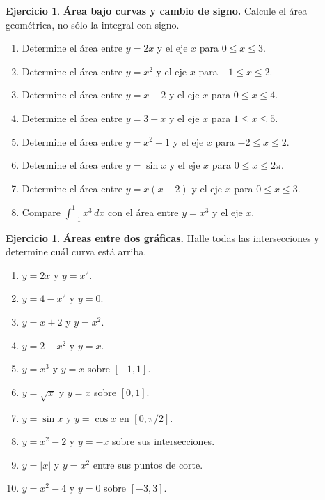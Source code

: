\documentclass[12pt]{article}
\theoremstyle{definition}
\newtheorem{Ejer}[teorema]{Ejercicio}
\theoremstyle{remark}
\newcommand{\dd}{\,dx}
\begin{document}
\begin{Ejer}\textbf{Área bajo curvas y cambio de signo.} Calcule el área geométrica, no sólo la integral con signo.
\begin{enumerate}[series=banco3]
\item Determine el área entre $y=2x$ y el eje $x$ para $0\le x\le3$.
\item Determine el área entre $y=x^2$ y el eje $x$ para $-1\le x\le2$.
\item Determine el área entre $y=x-2$ y el eje $x$ para $0\le x\le4$.
\item Determine el área entre $y=3-x$ y el eje $x$ para $1\le x\le5$.
\item Determine el área entre $y=x^2-1$ y el eje $x$ para $-2\le x\le2$.
\item Determine el área entre $y=\sin x$ y el eje $x$ para $0\le x\le2\pi$.
\item Determine el área entre $y=x(x-2)$ y el eje $x$ para $0\le x\le3$.
\item Compare $\int_{-1}^1x^3\dd$ con el área entre $y=x^3$ y el eje $x$.
\end{enumerate}
\end{Ejer}

\begin{Ejer}\textbf{Áreas entre dos gráficas.} Halle todas las intersecciones y determine cuál curva está arriba.
\begin{enumerate}[resume=banco3]
\item $y=2x$ y $y=x^2$.
\item $y=4-x^2$ y $y=0$.
\item $y=x+2$ y $y=x^2$.
\item $y=2-x^2$ y $y=x$.
\item $y=x^3$ y $y=x$ sobre $[-1,1]$.
\item $y=\sqrt x$ y $y=x$ sobre $[0,1]$.
\item $y=\sin x$ y $y=\cos x$ en $[0,\pi/2]$.
\item $y=x^2-2$ y $y=-x$ sobre sus intersecciones.
\item $y=|x|$ y $y=x^2$ entre sus puntos de corte.
\item $y=x^2-4$ y $y=0$ sobre $[-3,3]$.
\end{enumerate}
\end{Ejer}
\end{document}
